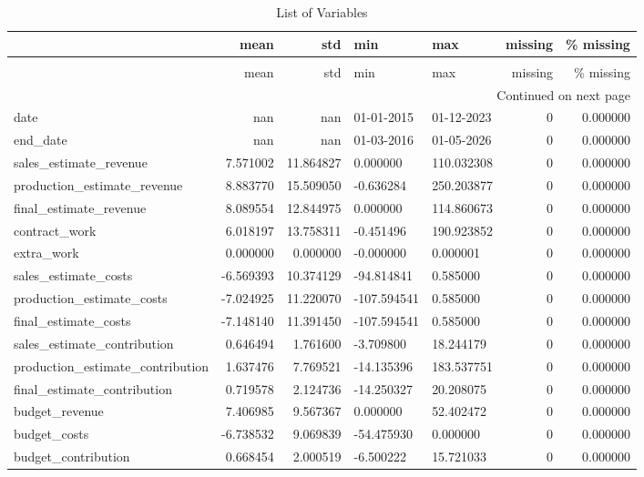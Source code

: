 \begin{landscape}\begin{longtable}[h!]{lrrllrr}
\caption{List of Variables} \label{eda_1} \\
\toprule
 & mean & std & min & max & missing & \% missing \\
\midrule
\endfirsthead
\caption[]{List of Variables} \\
\toprule
 & mean & std & min & max & missing & \% missing \\
\midrule
\endhead
\midrule
\multicolumn{7}{r}{Continued on next page} \\
\midrule
\endfoot
\bottomrule
\endlastfoot
date & nan & nan & 01-01-2015 & 01-12-2023 & 0 & 0.000000 \\
end_date & nan & nan & 01-03-2016 & 01-05-2026 & 0 & 0.000000 \\
sales_estimate_revenue & 7.571002 & 11.864827 & 0.000000 & 110.032308 & 0 & 0.000000 \\
production_estimate_revenue & 8.883770 & 15.509050 & -0.636284 & 250.203877 & 0 & 0.000000 \\
final_estimate_revenue & 8.089554 & 12.844975 & 0.000000 & 114.860673 & 0 & 0.000000 \\
contract_work & 6.018197 & 13.758311 & -0.451496 & 190.923852 & 0 & 0.000000 \\
extra_work & 0.000000 & 0.000000 & -0.000000 & 0.000001 & 0 & 0.000000 \\
sales_estimate_costs & -6.569393 & 10.374129 & -94.814841 & 0.585000 & 0 & 0.000000 \\
production_estimate_costs & -7.024925 & 11.220070 & -107.594541 & 0.585000 & 0 & 0.000000 \\
final_estimate_costs & -7.148140 & 11.391450 & -107.594541 & 0.585000 & 0 & 0.000000 \\
sales_estimate_contribution & 0.646494 & 1.761600 & -3.709800 & 18.244179 & 0 & 0.000000 \\
production_estimate_contribution & 1.637476 & 7.769521 & -14.135396 & 183.537751 & 0 & 0.000000 \\
final_estimate_contribution & 0.719578 & 2.124736 & -14.250327 & 20.208075 & 0 & 0.000000 \\
budget_revenue & 7.406985 & 9.567367 & 0.000000 & 52.402472 & 0 & 0.000000 \\
budget_costs & -6.738532 & 9.069839 & -54.475930 & 0.000000 & 0 & 0.000000 \\
budget_contribution & 0.668454 & 2.000519 & -6.500222 & 15.721033 & 0 & 0.000000 \\

\end{longtable}
\end{landscape}
